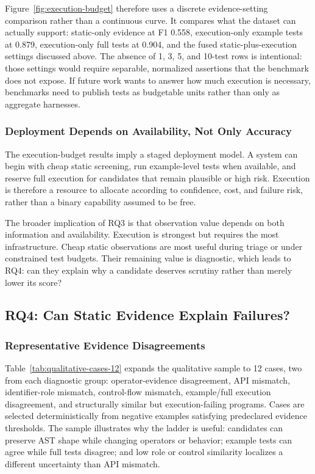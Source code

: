 ﻿\documentclass[conference]{IEEEtran}
\begin{document}
Figure~\ref{fig:execution-budget} therefore uses a discrete evidence-setting comparison rather than a continuous curve. It compares what the dataset can actually support: static-only evidence at F1 0.558, execution-only example tests at 0.879, execution-only full tests at 0.904, and the fused static-plus-execution settings discussed above. The absence of 1, 3, 5, and 10-test rows is intentional: those settings would require separable, normalized assertions that the benchmark does not expose. If future work wants to answer how much execution is necessary, benchmarks need to publish tests as budgetable units rather than only as aggregate harnesses.


\subsubsection{Deployment Depends on Availability, Not Only Accuracy}
The execution-budget results imply a staged deployment model. A system can begin with cheap static screening, run example-level tests when available, and reserve full execution for candidates that remain plausible or high risk. Execution is therefore a resource to allocate according to confidence, cost, and failure risk, rather than a binary capability assumed to be free.

The broader implication of RQ3 is that observation value depends on both information and availability. Execution is strongest but requires the most infrastructure. Cheap static observations are most useful during triage or under constrained test budgets. Their remaining value is diagnostic, which leads to RQ4: can they explain why a candidate deserves scrutiny rather than merely lower its score?

\subsection{RQ4: Can Static Evidence Explain Failures?}
\subsubsection{Representative Evidence Disagreements}
Table~\ref{tab:qualitative-cases-12} expands the qualitative sample to 12 cases, two from each diagnostic group: operator-evidence disagreement, API mismatch, identifier-role mismatch, control-flow mismatch, example/full execution disagreement, and structurally similar but execution-failing programs. Cases are selected deterministically from negative examples satisfying predeclared evidence thresholds. The sample illustrates why the ladder is useful: candidates can preserve AST shape while changing operators or behavior; example tests can agree while full tests disagree; and low role or control similarity localizes a different uncertainty than API mismatch.
\end{document}
